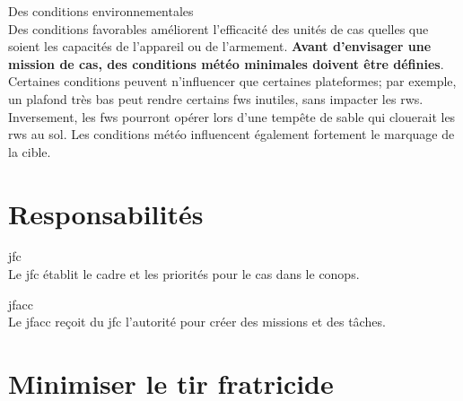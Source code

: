 		\item Des conditions environnementales \\
		Des conditions favorables améliorent l'efficacité des unités de \gls{cas} quelles que soient les capacités de l'appareil ou de l'armement. \textbf{Avant d'envisager une mission de \gls{cas}, des conditions météo minimales doivent être définies}. Certaines conditions peuvent n'influencer que certaines plateformes; par exemple, un plafond très bas peut rendre certains \glspl{fw} inutiles, sans impacter les \glspl{rw}. Inversement, les \glspl{fw} pourront opérer lors d'une tempête de sable qui clouerait les \glspl{rw} au sol. Les conditions météo influencent également fortement le marquage de la cible.	
		
	\ed
\ed

\section{Responsabilités}

\e
	\item \gls{jfc} \\
	Le \gls{jfc} établit le cadre et les priorités pour le \gls{cas} dans le \gls{conops}.
	
	\item \gls{jfacc} \\
	Le \gls{jfacc} reçoit du \gls{jfc} l'autorité pour créer des missions et des tâches.
	
	\item {}
\ed
	
\section{Minimiser le tir fratricide}

